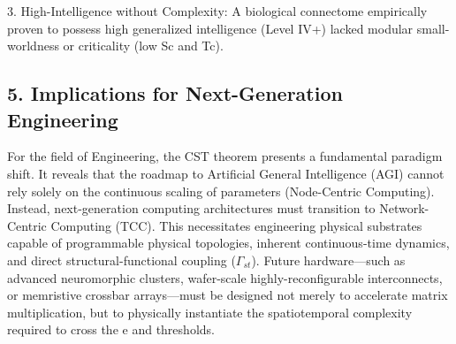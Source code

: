 \documentclass[a4paper,12pt]{article}
\begin{document}
3. High-Intelligence without Complexity: A biological connectome empirically proven to possess high generalized intelligence (Level IV+) lacked modular small-worldness or criticality (low Sc and Tc).

\subsection{5. Implications for Next-Generation Engineering}

For the field of Engineering, the CST theorem presents a fundamental paradigm shift.
It reveals that the roadmap to Artificial General Intelligence (AGI) cannot rely solely on the continuous scaling of parameters (Node-Centric Computing).
Instead, next-generation computing architectures must transition to Network-Centric Computing (TCC).
This necessitates engineering physical substrates capable of programmable physical topologies, inherent continuous-time dynamics, and direct structural-functional coupling ($\Gamma_{st}$).
Future hardware---such as advanced neuromorphic clusters, wafer-scale highly-reconfigurable interconnects, or memristive crossbar arrays---must be designed not merely to accelerate matrix multiplication, but to physically instantiate the spatiotemporal complexity required to cross the e and  \pi  thresholds.
\end{document}
